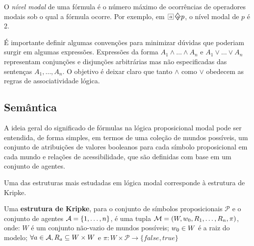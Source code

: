 O \emph{nível modal} de uma fórmula é o número máximo de ocorrências de
operadores modais sob o qual a fórmula ocorre. Por exemplo, em
$\nec{\agent}\pos{\agent}p$, o nível modal de $p$ é 2.

É importante definir algumas convenções para minimizar 
dúvidas que poderiam surgir em algumas expressões.
Expressões da forma $A_1 \wedge \ldots \wedge A_n$ e $A_1 \vee \ldots \vee A_n$
representam conjunções e disjunções arbitrárias mas não especificadas das
sentenças $A_1,\ldots,A_n$. O objetivo é deixar claro que tanto $\wedge$ como
$\vee$ obedecem as regras de associatividade lógica. 

\subsection{Semântica}
\label{semantics}

A ideia geral do significado de fórmulas na lógica proposicional modal pode ser
entendida, de forma simples, em termos de uma coleção de mundos possíveis, um conjunto
de atribuições de valores booleanos para cada símbolo proposicional em cada
mundo e relações de acessibilidade, que são definidas com base em um conjunto de
agentes.

Uma das estruturas mais estudadas em lógica modal corresponde à estrutura de
Kripke. 

\begin{definition}
    Uma \textbf{estrutura de Kripke}, para o conjunto de símbolos proposicionais
    $\mathcal{P}$ e o conjunto de agentes ${\cal{A}} = \{1,\ldots, n\}$, é
    uma tupla $\mathcal{M} = (W, w_0, R_1,\ldots, R_n, \pi)$, onde:
   $W$ é um conjunto não-vazio de mundos possíveis; $w_0 \in W$ é a raiz do modelo; 
   $\forall a \in {\cal{A}}, R_{a} \subseteq W \times W$ e
   $\pi : W \times \mathcal{P} \longrightarrow \{false, true\}$
    
\end{definition}


